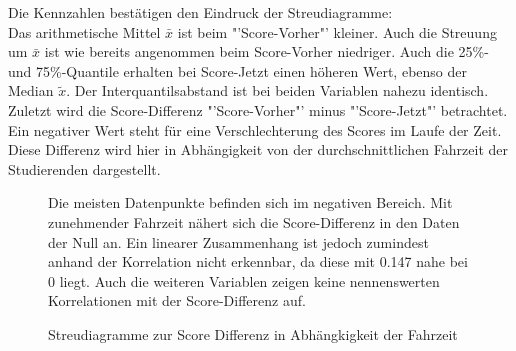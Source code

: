 \documentclass[11pt, a4paper]{article}
\begin{document}
	Die Kennzahlen bestätigen den Eindruck der Streudiagramme:\\
Das arithmetische Mittel $\bar{x}$ ist beim "'Score-Vorher"' kleiner.
Auch die Streuung um $\bar{x}$ ist wie bereits angenommen beim Score-Vorher niedriger. Auch die 25\%- und 75\%-Quantile erhalten bei Score-Jetzt einen höheren Wert, ebenso der Median $\tilde{x}$.
Der Interquantilsabstand ist bei beiden Variablen nahezu identisch. \\
Zuletzt wird die Score-Differenz "'Score-Vorher"' minus "'Score-Jetzt"' betrachtet. 
Ein negativer Wert steht für eine Verschlechterung des Scores im Laufe der Zeit.
Diese Differenz wird hier in Abhängigkeit von der durchschnittlichen Fahrzeit der Studierenden dargestellt.

	
\begin{figure}[h]
	{\centering 
		\vspace{-0.5cm}
		\caption{ Streudiagramme zur Score Differenz in Abhängkigkeit der Fahrzeit }}
		\vspace{1cm}
		
	Die meisten Datenpunkte befinden sich im negativen Bereich. Mit zunehmender Fahrzeit nähert sich die Score-Differenz in den Daten der Null an. Ein linearer Zusammenhang ist jedoch zumindest anhand der Korrelation nicht erkennbar, da diese mit 0.147 nahe bei 0 liegt. Auch die weiteren Variablen zeigen keine nennenswerten Korrelationen mit der Score-Differenz auf.
		
		
\end{figure}



\newpage
\end{document}

